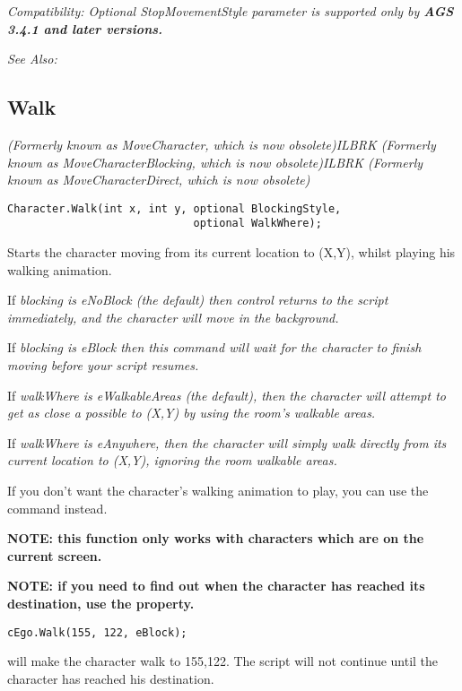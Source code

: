 \it{Compatibility:} Optional \it{StopMovementStyle} parameter is supported only by \bf{AGS 3.4.1} and later versions.

\it{See Also:} 



\subsection{Walk}\label{Character.Walk}%

\it{(Formerly known as MoveCharacter, which is now obsolete)}ILBRK
\it{(Formerly known as MoveCharacterBlocking, which is now obsolete)}ILBRK
\it{(Formerly known as MoveCharacterDirect, which is now obsolete)}

\begin{verbatim}
Character.Walk(int x, int y, optional BlockingStyle,
                             optional WalkWhere);
\end{verbatim}
Starts the character moving from its current location to (X,Y), whilst playing
his walking animation.

If \it{blocking} is eNoBlock (the default) then control returns to the script immediately, and
the character will move in the background.

If \it{blocking} is eBlock then this command will wait for the character
to finish moving before your script resumes.

If \it{walkWhere} is eWalkableAreas (the default), then the character will attempt to
get as close a possible to (X,Y) by using the room's walkable areas.

If \it{walkWhere} is eAnywhere, then the character will simply walk directly from its
current location to (X,Y), ignoring the room walkable areas.

If you don't want the character's walking animation to play, you can use the
 command instead.

\bf{NOTE:} this function only works with characters which are on the current screen.

\bf{NOTE:} if you need to find out when the character has reached its destination,
use the  property.

\begin{verbatim}
cEgo.Walk(155, 122, eBlock);
\end{verbatim}
will make the character walk to 155,122. The script will not continue until the
character has reached his destination.

